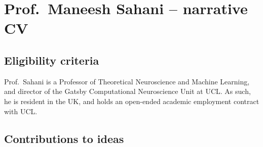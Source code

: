 % 
% 
% 
% 
% 
%

\section{Prof.\ Maneesh Sahani -- narrative CV}



\subsection{Eligibility criteria}

Prof.\ Sahani is a Professor of Theoretical Neuroscience and Machine
Learning, and director of the Gatsby Computational Neuroscience Unit
at UCL.
%
As such, he is resident in the UK, and holds an open-ended academic
employment contract with UCL.

% 

\subsection{Contributions to ideas}

